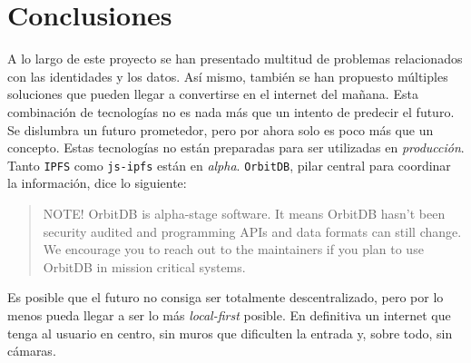 \chapter{Conclusiones}\label{Conclusiones}

\thispagestyle{fancy}

A lo largo de este proyecto se han presentado multitud de problemas relacionados con las identidades y los datos. Así mismo, también se han propuesto múltiples soluciones que pueden llegar a convertirse en el internet del mañana. Esta combinación de tecnologías no es nada más que un intento de predecir el futuro. Se dislumbra un futuro prometedor, pero por ahora solo es poco más que un concepto. Estas tecnologías no están preparadas para ser utilizadas en \textit{producción}. Tanto \verb|IPFS| como \verb|js-ipfs| están en \textit{alpha}. \verb|OrbitDB|, pilar central para coordinar la información, dice lo siguiente:
\begin{quote}
    NOTE! OrbitDB is alpha-stage software. It means OrbitDB hasn't been security audited and programming APIs and data formats can still change. We encourage you to reach out to the maintainers if you plan to use OrbitDB in mission critical systems. \cite{web:OrbitDBalpha}
\end{quote}
Es posible que el futuro no consiga ser totalmente descentralizado, pero por lo menos pueda llegar a ser lo más \textit{local-first} \cite{web:localfirst} posible. En definitiva un internet que tenga al usuario en centro, sin muros que dificulten la entrada y, sobre todo, sin cámaras.
\newpage
\thispagestyle{empty}